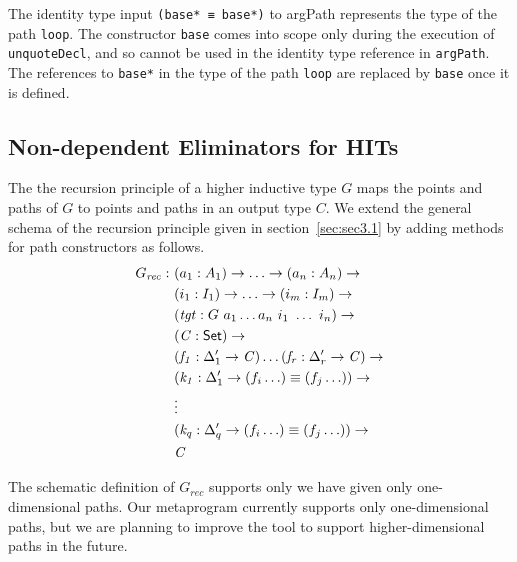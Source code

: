 \documentclass[sigplan,10pt]{acmart}
\begin{document}
The identity type input {\tt (base* ≡ base*)} to argPath represents the type of the path {\tt loop}. The constructor {\tt base} comes into scope only during the execution of {\tt unquoteDecl}, and so cannot be used in the identity type reference in {\tt argPath}. The references to \texttt{base*} in the type of the path \texttt{loop} are replaced by \texttt{base} once it is defined.

\subsection{Non-dependent Eliminators for HITs}
\label{sec:sec4.2}

The the recursion principle of a higher inductive type $G$ maps the points and paths of $G$ to points and paths in an output type $C$. We extend the general schema of the recursion principle given in section~\ref{sec:sec3.1} by adding methods for path constructors as follows.
\begin{align*}
G_{\mathit{rec}} :\ & (a_1 : A_1) \to \ldots \to (a_n : A_n) \to\\
& (i_1 : I_1) \to \ldots \to (i_m : I_m) \to\\
& (\mathit{tgt} : G\ a_1 \ldots a_n\ i_1\ \ldots\ i_n) \to\\
& (\mathit{C} : \textsf{Set}{}) \to \\
& (\mathit{f_1} : \Delta_1^\prime \to \mathit{C}) \ldots (\mathit{f_r} : \Delta_r^\prime \to \mathit{C}) \to \\
& (\mathit{k_1} : \Delta_1^\prime \to (f_i \ldots) \equiv (f_j \ldots)) \to \\
& \vdots \\
& (\mathit{k_q} : \Delta_q^\prime \to (f_i \ldots) \equiv (f_j \ldots)) \to \\
& \mathit{C}
\end{align*}
 
The schematic definition of $G_{\mathit{rec}}$ supports only we have given only one-dimensional paths.
Our metaprogram currently supports only one-dimensional paths, but we are planning to improve the tool to support higher-dimensional paths in the future. 
\end{document}
